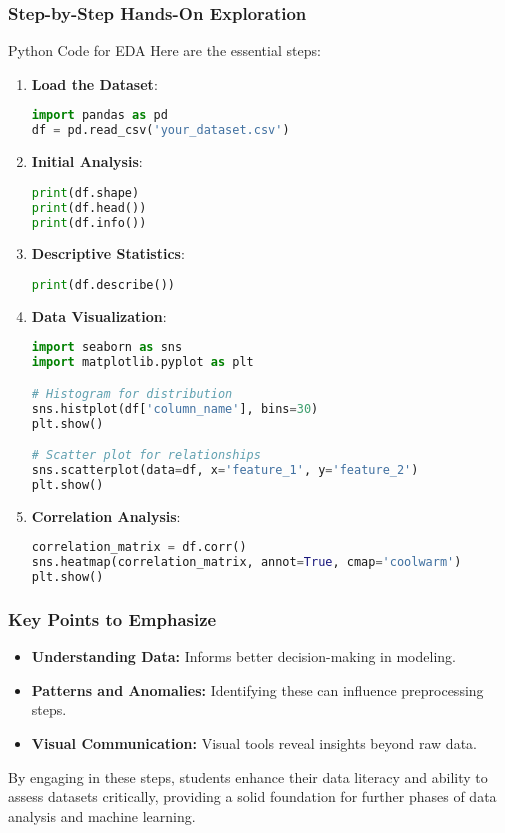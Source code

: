 \documentclass[aspectratio=169]{beamer}
\begin{document}
\begin{frame}[fragile]
    \frametitle{Step-by-Step Hands-On Exploration}
    \begin{block}{Python Code for EDA}
        Here are the essential steps:
        \begin{enumerate}
            \item \textbf{Load the Dataset}:
            \begin{lstlisting}[language=Python]
import pandas as pd
df = pd.read_csv('your_dataset.csv')
            \end{lstlisting}
            \item \textbf{Initial Analysis}:
            \begin{lstlisting}[language=Python]
print(df.shape)
print(df.head())
print(df.info())
            \end{lstlisting}
            \item \textbf{Descriptive Statistics}:
            \begin{lstlisting}[language=Python]
print(df.describe())
            \end{lstlisting}
            \item \textbf{Data Visualization}:
            \begin{lstlisting}[language=Python]
import seaborn as sns
import matplotlib.pyplot as plt

# Histogram for distribution
sns.histplot(df['column_name'], bins=30)
plt.show()

# Scatter plot for relationships
sns.scatterplot(data=df, x='feature_1', y='feature_2')
plt.show()
            \end{lstlisting}
            \item \textbf{Correlation Analysis}:
            \begin{lstlisting}[language=Python]
correlation_matrix = df.corr()
sns.heatmap(correlation_matrix, annot=True, cmap='coolwarm')
plt.show()
            \end{lstlisting}
        \end{enumerate}
    \end{block}
\end{frame}

\begin{frame}
    \frametitle{Key Points to Emphasize}
    \begin{itemize}
        \item \textbf{Understanding Data:} Informs better decision-making in modeling.
        \item \textbf{Patterns and Anomalies:} Identifying these can influence preprocessing steps.
        \item \textbf{Visual Communication:} Visual tools reveal insights beyond raw data.
    \end{itemize}
    
    By engaging in these steps, students enhance their data literacy and ability to assess datasets critically, providing a solid foundation for further phases of data analysis and machine learning.
\end{frame}
\end{document}

